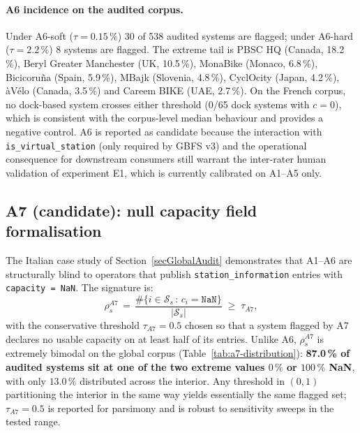 \documentclass[11pt,a4paper]{article}
\begin{document}
\paragraph{A6 incidence on the audited corpus.}
Under A6-soft ($\tau = 0.15\,\%$) 30 of 538 audited systems are
flagged; under A6-hard ($\tau = 2.2\,\%$) 8 systems are flagged. The
extreme tail is PBSC HQ (Canada, 18.2\,\%), Beryl Greater Manchester
(UK, 10.5\,\%), MonaBike (Monaco, 6.8\,\%), Bicicoru\~na (Spain,
5.9\,\%), MBajk (Slovenia, 4.8\,\%), CyclOcity (Japan, 4.2\,\%),
\`aV\'elo (Canada, 3.5\,\%) and Careem BIKE (UAE, 2.7\,\%). On the
French corpus, no dock-based system crosses either threshold
(0/65 dock systems with $c = 0$), which is consistent with the
corpus-level median behaviour and provides a negative control. A6
is reported as candidate because the interaction with
\texttt{is\_virtual\_station} (only required by GBFS v3) and the
operational consequence for downstream consumers still warrant the
inter-rater human validation of experiment E1, which is currently
calibrated on A1--A5 only.

\subsection{A7 (candidate): null capacity field formalisation}\label{secA7Formalisation}
The Italian case study of Section~\ref{secGlobalAudit} demonstrates
that A1--A6 are structurally blind to operators that publish
\texttt{station\_information} entries with \texttt{capacity =
NaN}. The signature is:
\begin{equation}
\rho_s^{A7} \,=\,
\frac{\#\{i \in \mathcal{S}_s \,:\, c_i = \mathtt{NaN}\}}{|\mathcal{S}_s|}
\;\geq\; \tau_{A7},
\end{equation}
with the conservative threshold $\tau_{A7} = 0.5$ chosen so that a
system flagged by A7 declares no usable capacity on at least half
of its entries. Unlike A6, $\rho_s^{A7}$ is extremely bimodal on
the global corpus
(Table~\ref{tab:a7-distribution}): \textbf{87.0\,\% of audited
systems sit at one of the two extreme values $0\,\%$ or $100\,\%$
NaN}, with only $13.0\,\%$ distributed across the interior. Any
threshold in $(0, 1)$ partitioning the interior in the same way
yields essentially the same flagged set; $\tau_{A7} = 0.5$ is
reported for parsimony and is robust to sensitivity sweeps in the
tested range.
\end{document}
